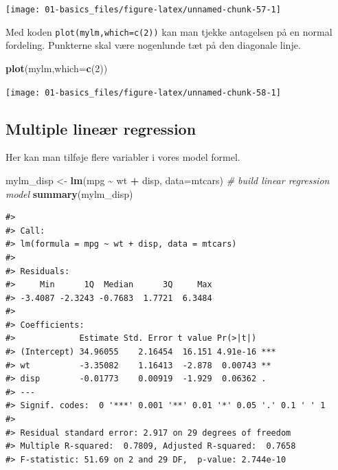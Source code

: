 \documentclass[
]{book}
\newenvironment{Shaded}{\begin{snugshade}}{\end{snugshade}}
\newcommand{\AttributeTok}[1]{\textcolor[rgb]{0.27,0.27,0.27}{#1}}
\newcommand{\CommentTok}[1]{\textcolor[rgb]{0.37,0.37,0.37}{\textit{#1}}}
\newcommand{\DecValTok}[1]{\textcolor[rgb]{0.06,0.06,0.06}{#1}}
\newcommand{\FunctionTok}[1]{\textcolor[rgb]{0.27,0.27,0.27}{\textbf{#1}}}
\newcommand{\NormalTok}[1]{#1}
\newcommand{\OtherTok}[1]{\textcolor[rgb]{0.37,0.37,0.37}{#1}}
\newcommand{\SpecialCharTok}[1]{\textcolor[rgb]{0.43,0.43,0.43}{\textbf{#1}}}
\begin{document}
\begin{center}\texttt{[image: 01-basics\_files/figure-latex/unnamed-chunk-57-1]} \end{center}

Med koden \texttt{plot(mylm,which=c(2))} kan man tjekke antagelsen på en normal fordeling. Punkterne skal være nogenlunde tæt på den diagonale linje.

\begin{Shaded}
\begin{Highlighting}[]
\FunctionTok{plot}\NormalTok{(mylm,}\AttributeTok{which=}\FunctionTok{c}\NormalTok{(}\DecValTok{2}\NormalTok{))}
\end{Highlighting}
\end{Shaded}

\begin{center}\texttt{[image: 01-basics\_files/figure-latex/unnamed-chunk-58-1]} \end{center}

\subsection{Multiple lineær regression}\label{multiple-lineuxe6r-regression}

Her kan man tilføje flere variabler i vores model formel.

\begin{Shaded}
\begin{Highlighting}[]
\NormalTok{mylm\_disp }\OtherTok{\textless{}{-}} \FunctionTok{lm}\NormalTok{(mpg }\SpecialCharTok{\textasciitilde{}}\NormalTok{ wt }\SpecialCharTok{+}\NormalTok{ disp, }\AttributeTok{data=}\NormalTok{mtcars) }\CommentTok{\# build linear regression model}
\FunctionTok{summary}\NormalTok{(mylm\_disp)}
\end{Highlighting}
\end{Shaded}

\begin{verbatim}
#> 
#> Call:
#> lm(formula = mpg ~ wt + disp, data = mtcars)
#> 
#> Residuals:
#>     Min      1Q  Median      3Q     Max 
#> -3.4087 -2.3243 -0.7683  1.7721  6.3484 
#> 
#> Coefficients:
#>             Estimate Std. Error t value Pr(>|t|)    
#> (Intercept) 34.96055    2.16454  16.151 4.91e-16 ***
#> wt          -3.35082    1.16413  -2.878  0.00743 ** 
#> disp        -0.01773    0.00919  -1.929  0.06362 .  
#> ---
#> Signif. codes:  0 '***' 0.001 '**' 0.01 '*' 0.05 '.' 0.1 ' ' 1
#> 
#> Residual standard error: 2.917 on 29 degrees of freedom
#> Multiple R-squared:  0.7809, Adjusted R-squared:  0.7658 
#> F-statistic: 51.69 on 2 and 29 DF,  p-value: 2.744e-10
\end{verbatim}
\end{document}
